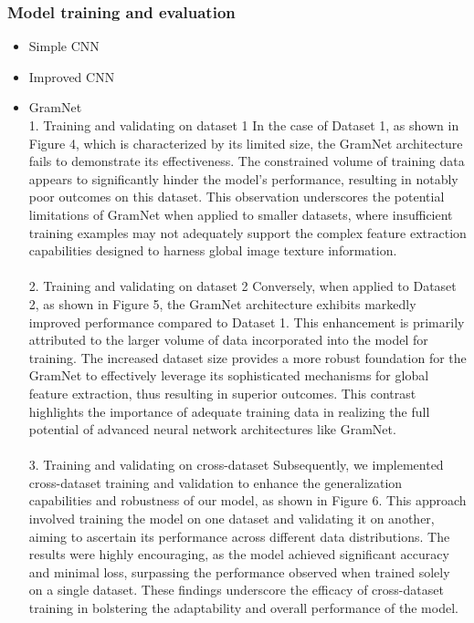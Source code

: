 \documentclass[rebuttal]{cvpr}
\begin{document}
\subsubsection{Model training and evaluation}
\begin{itemize}
        \item Simple CNN \\
        \item Improved CNN \\
        \item GramNet \\
        1. Training and validating on dataset 1
            In the case of Dataset 1, as shown in Figure 4, which is characterized by its limited size, the GramNet architecture fails to demonstrate its effectiveness. The constrained volume of training data appears to significantly hinder the model's performance, resulting in notably poor outcomes on this dataset. This observation underscores the potential limitations of GramNet when applied to smaller datasets, where insufficient training examples may not adequately support the complex feature extraction capabilities designed to harness global image texture information.   
            \\
            \\
        2. Training and validating on dataset 2
           Conversely, when applied to Dataset 2, as shown in Figure 5, the GramNet architecture exhibits markedly improved performance compared to Dataset 1. This enhancement is primarily attributed to the larger volume of data incorporated into the model for training. The increased dataset size provides a more robust foundation for the GramNet to effectively leverage its sophisticated mechanisms for global feature extraction, thus resulting in superior outcomes. This contrast highlights the importance of adequate training data in realizing the full potential of advanced neural network architectures like GramNet.
            \\
            \\
        3. Training and validating on cross-dataset
            Subsequently, we implemented cross-dataset training and validation to enhance the generalization capabilities and robustness of our model, as shown in Figure 6. This approach involved training the model on one dataset and validating it on another, aiming to ascertain its performance across different data distributions. The results were highly encouraging, as the model achieved significant accuracy and minimal loss, surpassing the performance observed when trained solely on a single dataset. These findings underscore the efficacy of cross-dataset training in bolstering the adaptability and overall performance of the model.

\end{itemize}
\end{document}
